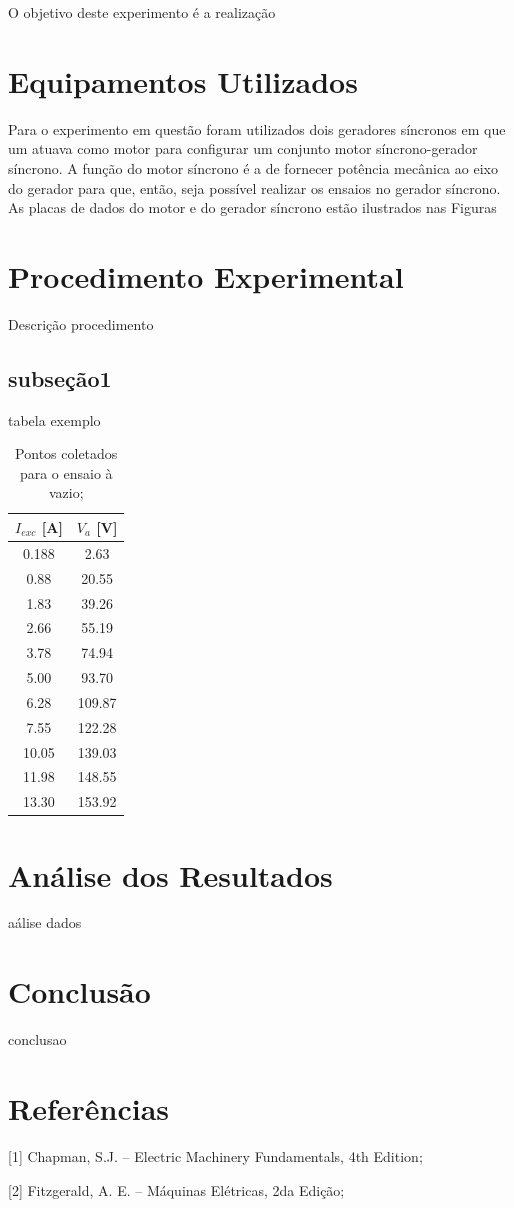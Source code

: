 \documentclass[a4paper, 12pt]{article}
\begin{document}
O objetivo deste experimento é a realização 
\section{Equipamentos Utilizados}

Para o experimento em questão foram utilizados dois geradores síncronos em que um atuava como motor para configurar um conjunto motor síncrono-gerador síncrono. A função do motor síncrono é a de fornecer potência mecânica ao eixo do gerador para que, então, seja possível realizar os ensaios no gerador síncrono. As placas de dados do motor e do gerador síncrono estão ilustrados nas Figuras 

\section{Procedimento Experimental}

Descrição procedimento

\subsection{subseção1}

tabela exemplo

\begin{table}[htb]
\centering
\begin{tabular}{c|c}
$I_{exc}$ [A] & $V_{a}$ [V] \\ \hline
0.188	& 2.63 		\\\hline
0.88 & 20.55	\\\hline
1.83 & 39.26 \\\hline
2.66 & 55.19 \\\hline
3.78 & 74.94 \\\hline
5.00 & 93.70 \\\hline
6.28 & 109.87 \\\hline
7.55 & 122.28 \\\hline
10.05 & 139.03 \\\hline
11.98 & 148.55 \\\hline
13.30 & 153.92 
\end{tabular}
\caption{Pontos coletados para o ensaio à vazio;}
\label{vazio}
\end{table}



\section{Análise dos Resultados}


aálise dados
\section{Conclusão}

conclusao



\newpage
\section{Referências}

[1] Chapman, S.J. -- Electric Machinery Fundamentals, 4th Edition;

[2] Fitzgerald, A. E. -- Máquinas Elétricas, 2da Edição;
\end{document}
